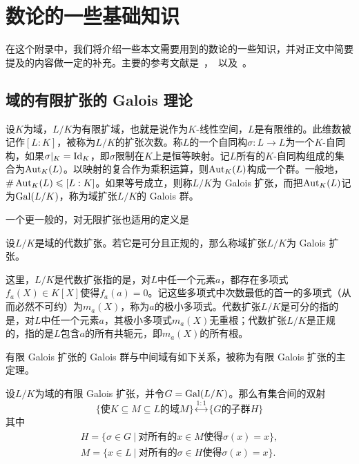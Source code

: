 \chapter{数论的一些基础知识}
\label{apdx: number theory}
在这个附录中，我们将介绍一些本文需要用到的数论的一些知识，并对正文中简要提及的内容做一定的补充。主要的参考文献是~，~以及~。
\section{域的有限扩张的 Galois 理论}
\label{apdx: galois theory}
设$K$为域，$L/K$为有限扩域，也就是说作为$K$-线性空间，$L$是有限维的。此维数被记作$[L:K]$，被称为$L/K$的扩张次数。称$L$的一个自同构$\sigma: L \to L$为一个$K$-自同构，如果$\sigma|_K = \operatorname{Id}_K$，即$\sigma$限制在$K$上是恒等映射。记$L$所有的$K$-自同构组成的集合为$\operatorname{Aut}_K(L)$。以映射的复合作为乘积运算，则$\operatorname{Aut}_K(L)$构成一个群。一般地，$\#\operatorname{Aut}_K(L) \leqslant [L:K]$。如果等号成立，则称$L/K$为 Galois 扩张，而把$\operatorname{Aut}_K(L)$记为$\operatorname{Gal}(L/K)$，称为域扩张$L/K$的 Galois 群。

一个更一般的，对无限扩张也适用的定义是
\begin{definition}
设$L/K$是域的代数扩张。若它是可分且正规的，那么称域扩张$L/K$为 Galois 扩张。
\end{definition}
这里，$L/K$是代数扩张指的是，对$L$中任一个元素$a$，都存在多项式$f_a(X) \in K[X]$使得$f_a(a)=0$。记这些多项式中次数最低的首一的多项式（从而必然不可约）为$m_a(X)$，称为$a$的极小多项式。代数扩张$L/K$是可分的指的是，对$L$中任一个元素$a$，其极小多项式$m_a(X)$无重根；代数扩张$L/K$是正规的，指的是$L$包含$a$的所有共轭元，即$m_a(X)$的所有根。

有限 Galois 扩张的 Galois 群与中间域有如下关系，被称为有限 Galois 扩张的主定理。
\begin{theorem}
\label{galois main theorem}
设$L/K$为域的有限 Galois 扩张，并令$G = \operatorname{Gal}(L/K)$。那么有集合间的双射
\begin{equation}
\{ \text{使$K\subseteq M \subseteq L$的域$M$} \} \overset{1:1}{\longleftrightarrow} \{ \text{$G$的子群$H$} \}
\end{equation}
其中
\begin{gather*}
H = \{ \sigma \in G \ |\ \text{对所有的$x\in M$使得$\sigma(x) = x$} \}, \\
M = \{ x\in L \ |\ \text{对所有的$\sigma\in H$使得$\sigma(x) = x$} \}.
\end{gather*}
\end{theorem}

